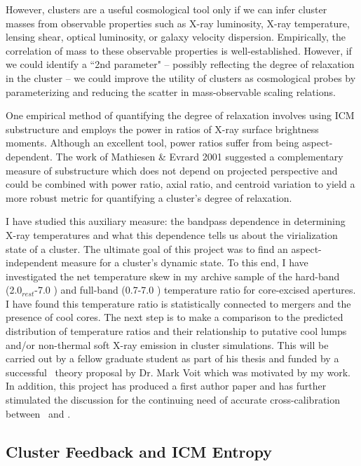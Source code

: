 \documentclass[11pt]{article}
\begin{document}
However, clusters are a useful cosmological tool only if we can infer
cluster masses from observable properties such as X-ray luminosity,
X-ray temperature, lensing shear, optical luminosity, or galaxy
velocity dispersion. Empirically, the correlation of mass to these
observable properties is well-established. However, if we could
identify a ``2nd parameter" -- possibly reflecting the degree of
relaxation in the cluster -- we could improve the utility of clusters
as cosmological probes by parameterizing and reducing the scatter in
mass-observable scaling relations.

One empirical method of quantifying the degree of relaxation involves
using ICM substructure and employs the power in ratios of X-ray surface
brightness moments. Although an excellent tool, power ratios suffer
from being aspect-dependent. The work of Mathiesen \& Evrard 2001
suggested a complementary measure of substructure which does not
depend on projected perspective and could be combined with power
ratio, axial ratio, and centroid variation to yield a more robust
metric for quantifying a cluster's degree of relaxation.

I have studied this auxiliary measure: the bandpass dependence in
determining X-ray temperatures and what this dependence tells us about
the virialization state of a cluster. The ultimate goal of this
project was to find an aspect-independent measure for a cluster's
dynamic state. To this end, I have investigated the net temperature
skew in my archive sample of the hard-band (2.0$_{rest}$-7.0 \keV) and
full-band (0.7-7.0 \keV) temperature ratio for core-excised
apertures. I have found this temperature ratio is statistically
connected to mergers and the presence of cool cores. The next step is
to make a comparison to the predicted distribution of temperature
ratios and their relationship to putative cool lumps and/or
non-thermal soft X-ray emission in cluster simulations. This will be
carried out by a fellow graduate student as part of his thesis and
funded by a successful \chandra\ theory proposal by Dr. Mark
Voit which was motivated by my work. In addition, this project has
produced a first author paper and has further stimulated the
discussion for the continuing need of accurate cross-calibration
between \xmm\ and \chandra.

\subsection*{Cluster Feedback and ICM Entropy}
\end{document}
